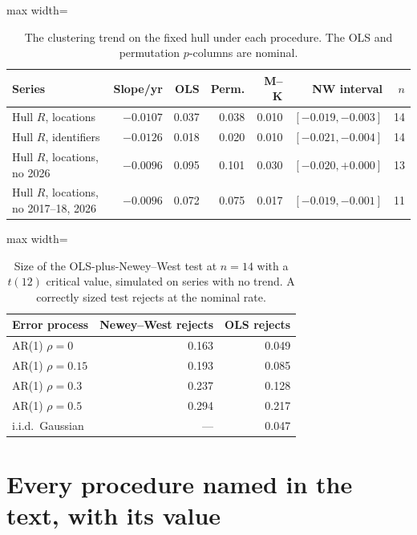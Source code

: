 \documentclass[fleqn,10pt]{wlpeerj}
\begin{document}
\begin{table}[H]
\centering
\caption{The clustering trend on the fixed hull under each procedure. The OLS and permutation $p$-columns are nominal.}
\label{si:trend}
\footnotesize
\setlength{\tabcolsep}{4pt}
\begin{adjustbox}{max width=\linewidth}
\begin{tabular}{lrrrrrr}
\toprule
Series & Slope/yr & OLS & Perm. & M--K & NW interval & $n$ \\
\midrule
Hull $R$, locations & $-0.0107$ & 0.037 & 0.038 & 0.010 & $[-0.019, -0.003]$ & 14 \\
Hull $R$, identifiers & $-0.0126$ & 0.018 & 0.020 & 0.010 & $[-0.021, -0.004]$ & 14 \\
Hull $R$, locations, no 2026 & $-0.0096$ & 0.095 & 0.101 & 0.030 & $[-0.020, +0.000]$ & 13 \\
Hull $R$, locations, no 2017--18, 2026 & $-0.0096$ & 0.072 & 0.075 & 0.017 & $[-0.019, -0.001]$ & 11 \\
\bottomrule
\end{tabular}
\end{adjustbox}
\end{table}

\begin{table}[H]
\centering
\caption{Size of the OLS-plus-Newey--West test at $n = 14$ with a $t(12)$ critical value,
simulated on series with no trend. A correctly sized test rejects at the nominal rate.}
\label{si:size}
\small
\begin{adjustbox}{max width=\linewidth}
\begin{tabular}{lrr}
\toprule
Error process & Newey--West rejects & OLS rejects \\
\midrule
AR(1) $\rho = 0$ & 0.163 & 0.049 \\
AR(1) $\rho = 0.15$ & 0.193 & 0.085 \\
AR(1) $\rho = 0.3$ & 0.237 & 0.128 \\
AR(1) $\rho = 0.5$ & 0.294 & 0.217 \\
i.i.d.\ Gaussian & --- & 0.047 \\
\bottomrule
\end{tabular}
\end{adjustbox}
\end{table}

\section{Every procedure named in the text, with its value}
\label{si:procedures}
\end{document}
